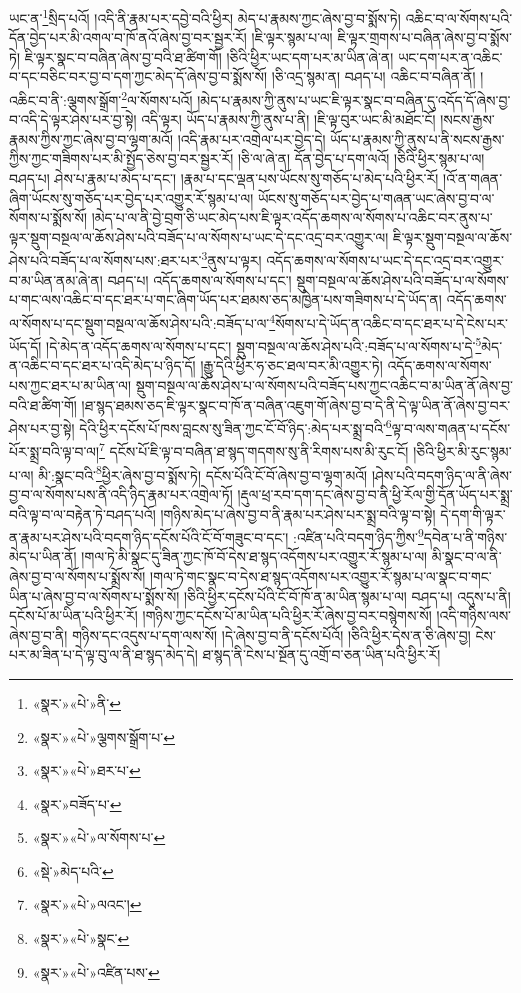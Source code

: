 ཡང་ན་\footnote{«སྣར་»«པེ་»ནི་}སྲིད་པའོ། །འདི་ནི་རྣམ་པར་དབྱེ་བའི་ཕྱིར། མེད་པ་རྣམས་ཀྱང་ཞེས་བྱ་བ་སྨོས་ཏེ། འཆིང་བ་ལ་སོགས་པའི་དོན་བྱེད་པར་མི་འགལ་བ་ཁོ་ནའོ་ཞེས་བྱ་བར་སྦྱར་རོ། །ཇི་ལྟར་སྙམ་པ་ལ། ཇི་ལྟར་གྲགས་པ་བཞིན་ཞེས་བྱ་བ་སྨོས་ཏེ། ཇི་ལྟར་སྣང་བ་བཞིན་ཞེས་བྱ་བའི་ཐ་ཚིག་གོ། །ཅིའི་ཕྱིར་ཡང་དག་པར་མ་ཡིན་ཞེ་ན། ཡང་དག་པར་ན་འཆིང་བ་དང་བཅིང་བར་བྱ་བ་དག་ཀྱང་མེད་དོ་ཞེས་བྱ་བ་སྨོས་སོ། །ཅི་འདྲ་སྙམ་ན། བཤད་པ། འཆིང་བ་བཞིན་ནོ། །འཆིང་བ་ནི་:ལྕགས་སྒྲོག་\footnote{«སྣར་»«པེ་»ལྕགས་སྒྲོག་པ་}ལ་སོགས་པའོ། །མེད་པ་རྣམས་ཀྱི་ནུས་པ་ཡང་ཇི་ལྟར་སྣང་བ་བཞིན་དུ་འདོད་དོ་ཞེས་བྱ་བ་འདི་དེ་ལྟར་ཤེས་པར་བྱ་སྟེ། འདི་ལྟར། ཡོད་པ་རྣམས་ཀྱི་ནུས་པ་ནི། །ཇི་ལྟ་བུར་ཡང་མི་མཐོང་ངོ། །སངས་རྒྱས་རྣམས་ཀྱིས་ཀྱང་ཞེས་བྱ་བ་ལྷག་མའོ། །འདི་རྣམ་པར་འགྲེལ་པར་བྱེད་དེ། ཡོད་པ་རྣམས་ཀྱི་ནུས་པ་ནི་སངས་རྒྱས་ཀྱིས་ཀྱང་གཟིགས་པར་མི་སྤྱོད་ཅེས་བྱ་བར་སྦྱར་རོ། །ཅི་ལ་ཞེ་ན། དོན་བྱེད་པ་དག་ལའོ། །ཅིའི་ཕྱིར་སྙམ་པ་ལ། བཤད་པ། ཤེས་པ་རྣམ་པ་མེད་པ་དང་། །རྣམ་པ་དང་ལྡན་པས་ཡོངས་སུ་གཅོད་པ་མེད་པའི་ཕྱིར་རོ། །འོ་ན་གཞན་ཞིག་ཡོངས་སུ་གཅོད་པར་བྱེད་པར་འགྱུར་རོ་སྙམ་པ་ལ། ཡོངས་སུ་གཅོད་པར་བྱེད་པ་གཞན་ཡང་ཞེས་བྱ་བ་ལ་སོགས་པ་སྨོས་སོ། །མེད་པ་ལ་ནི་བྱེ་བྲག་ཅི་ཡང་མེད་པས་ཇི་ལྟར་འདོད་ཆགས་ལ་སོགས་པ་འཆིང་བར་ནུས་པ་ལྟར་སྡུག་བསྔལ་ལ་ཆོས་ཤེས་པའི་བཟོད་པ་ལ་སོགས་པ་ཡང་དེ་དང་འདྲ་བར་འགྱུར་ལ། ཇི་ལྟར་སྡུག་བསྔལ་ལ་ཆོས་ཤེས་པའི་བཟོད་པ་ལ་སོགས་པས་:ཐར་པར་\footnote{«སྣར་»«པེ་»ཐར་པ་}ནུས་པ་ལྟར། འདོད་ཆགས་ལ་སོགས་པ་ཡང་དེ་དང་འདྲ་བར་འགྱུར་བ་མ་ཡིན་ནམ་ཞེ་ན། བཤད་པ། འདོད་ཆགས་ལ་སོགས་པ་དང་། སྡུག་བསྔལ་ལ་ཆོས་ཤེས་པའི་བཟོད་པ་ལ་སོགས་པ་གང་ལས་འཆིང་བ་དང་ཐར་པ་གང་ཞིག་ཡོད་པར་ཐམས་ཅད་མཁྱེན་པས་གཟིགས་པ་དེ་ཡོད་ན། འདོད་ཆགས་ལ་སོགས་པ་དང་སྡུག་བསྔལ་ལ་ཆོས་ཤེས་པའི་:བཟོད་པ་ལ་\footnote{«སྣར་»བཟོད་པ་}སོགས་པ་དེ་ཡོད་ན་འཆིང་བ་དང་ཐར་པ་དེ་ངེས་པར་ཡོད་དོ། །དེ་མེད་ན་འདོད་ཆགས་ལ་སོགས་པ་དང་། སྡུག་བསྔལ་ལ་ཆོས་ཤེས་པའི་:བཟོད་པ་ལ་སོགས་པ་དེ་\footnote{«སྣར་»«པེ་»ལ་སོགས་པ་}མེད་ན་འཆིང་བ་དང་ཐར་པ་འདི་མེད་པ་ཉིད་དོ། །རྒྱུ་དེའི་ཕྱིར་ཧ་ཅང་ཐལ་བར་མི་འགྱུར་ཏེ། འདོད་ཆགས་ལ་སོགས་པས་ཀྱང་ཐར་པ་མ་ཡིན་ལ། སྡུག་བསྔལ་ལ་ཆོས་ཤེས་པ་ལ་སོགས་པའི་བཟོད་པས་ཀྱང་འཆིང་བ་མ་ཡིན་ནོ་ཞེས་བྱ་བའི་ཐ་ཚིག་གོ། །ཐ་སྙད་ཐམས་ཅད་ཇི་ལྟར་སྣང་བ་ཁོ་ན་བཞིན་འཇུག་གོ་ཞེས་བྱ་བ་དེ་ནི་དེ་ལྟ་ཡིན་ནོ་ཞེས་བྱ་བར་ཤེས་པར་བྱ་སྟེ། དེའི་ཕྱིར་དངོས་པོ་ཁས་བླངས་སུ་ཟིན་ཀྱང་ངོ་བོ་ཉིད་:མེད་པར་སྨྲ་བའི་\footnote{«སྡེ་»མེད་པའི་}ལྟ་བ་ལས་གཞན་པ་དངོས་པོར་སྨྲ་བའི་ལྟ་བ་ལ།\footnote{«སྣར་»«པེ་»ལའང་།} དངོས་པོ་ཇི་ལྟ་བ་བཞིན་ཐ་སྙད་གདགས་སུ་ནི་རིགས་པས་མི་རུང་ངོ། །ཅིའི་ཕྱིར་མི་རུང་སྙམ་པ་ལ། མི་:སྣང་བའི་\footnote{«སྣར་»«པེ་»སྣང་}ཕྱིར་ཞེས་བྱ་བ་སྨོས་ཏེ། དངོས་པོའི་ངོ་བོ་ཞེས་བྱ་བ་ལྷག་མའོ། །ཤེས་པའི་བདག་ཉིད་ལ་ནི་ཞེས་བྱ་བ་ལ་སོགས་པས་ནི་འདི་ཉིད་རྣམ་པར་འགྲེལ་ཏོ། །རྡུལ་ཕྲ་རབ་དག་དང་ཞེས་བྱ་བ་ནི་ཕྱི་རོལ་གྱི་དོན་ཡོད་པར་སྨྲ་བའི་ལྟ་བ་ལ་བརྟེན་ཏེ་བཤད་པའོ། །གཉིས་མེད་པ་ཞེས་བྱ་བ་ནི་རྣམ་པར་ཤེས་པར་སྨྲ་བའི་ལྟ་བ་སྟེ། དེ་དག་གི་ལྟར་ན་རྣམ་པར་ཤེས་པའི་བདག་ཉིད་དངོས་པོའི་ངོ་བོ་གཟུང་བ་དང་། :འཛིན་པའི་བདག་ཉིད་ཀྱིས་\footnote{«སྣར་»«པེ་»འཛིན་པས་}དབེན་པ་ནི་གཉིས་མེད་པ་ཡིན་ནོ། །གལ་ཏེ་མི་སྣང་དུ་ཟིན་ཀྱང་ཁོ་བོ་དེས་ཐ་སྙད་འདོགས་པར་འགྱུར་རོ་སྙམ་པ་ལ། མི་སྣང་བ་ལ་ནི་ཞེས་བྱ་བ་ལ་སོགས་པ་སྨྲོས་སོ། །གལ་ཏེ་གང་སྣང་བ་དེས་ཐ་སྙད་འདོགས་པར་འགྱུར་རོ་སྙམ་པ་ལ་སྣང་བ་གང་ཡིན་པ་ཞེས་བྱ་བ་ལ་སོགས་པ་སྨོས་སོ། །ཅིའི་ཕྱིར་དངོས་པོའི་ངོ་བོ་ཁོ་ན་མ་ཡིན་སྙམ་པ་ལ། བཤད་པ། འདུས་པ་ནི། དངོས་པོ་མ་ཡིན་པའི་ཕྱིར་རོ། །གཉིས་ཀྱང་དངོས་པོ་མ་ཡིན་པའི་ཕྱིར་རོ་ཞེས་བྱ་བར་བསྙེགས་སོ། །འདི་གཉིས་ལས་ཞེས་བྱ་བ་ནི། གཉིས་དང་འདུས་པ་དག་ལས་སོ། །དེ་ཞེས་བྱ་བ་ནི་དངོས་པོའོ། །ཅིའི་ཕྱིར་དེས་ན་ཅི་ཞེས་བྱ། ངེས་པར་མ་ཟིན་པ་དེ་ལྟ་བུ་ལ་ནི་ཐ་སྙད་མེད་དེ། ཐ་སྙད་ནི་ངེས་པ་སྔོན་དུ་འགྲོ་བ་ཅན་ཡིན་པའི་ཕྱིར་རོ། 
